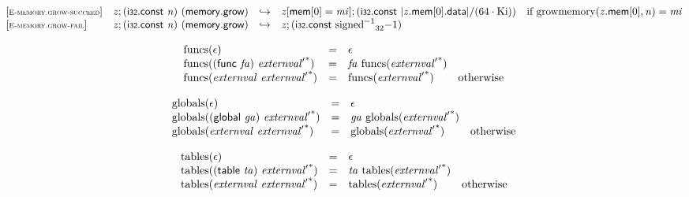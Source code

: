 \vspace{1ex}

$$
\begin{array}{@{}l@{}lcl@{}l@{}}
{[\textsc{\scriptsize E{-}memory.grow{-}succeed}]} \quad & {\mathit{z}} ; (\mathsf{i{\scriptstyle32}}.\mathsf{const}~{\mathit{n}})~(\mathsf{memory.grow}) &\hookrightarrow& {\mathit{z}}[\mathsf{mem}[0] = {\mathit{mi}}] ; (\mathsf{i{\scriptstyle32}}.\mathsf{const}~{|{{\mathit{z}}.\mathsf{mem}}{[0]}.\mathsf{data}|} / (64 \cdot {\mathrm{Ki}})) &\quad
  \mbox{if}~{\mathrm{growmemory}}({{\mathit{z}}.\mathsf{mem}}{[0]}, {\mathit{n}}) = {\mathit{mi}} \\
{[\textsc{\scriptsize E{-}memory.grow{-}fail}]} \quad & {\mathit{z}} ; (\mathsf{i{\scriptstyle32}}.\mathsf{const}~{\mathit{n}})~(\mathsf{memory.grow}) &\hookrightarrow& {\mathit{z}} ; (\mathsf{i{\scriptstyle32}}.\mathsf{const}~{{{{{\mathrm{signed}}^{{-1}}}}{}}_{32}}{{-1}}) &  \\
\end{array}
$$

$$
\begin{array}{@{}lcl@{}l@{}}
{\mathrm{funcs}}(\epsilon) &=& \epsilon &  \\
{\mathrm{funcs}}((\mathsf{func}~{\mathit{fa}})~{{\mathit{externval}'}^\ast}) &=& {\mathit{fa}}~{\mathrm{funcs}}({{\mathit{externval}'}^\ast}) &  \\
{\mathrm{funcs}}({\mathit{externval}}~{{\mathit{externval}'}^\ast}) &=& {\mathrm{funcs}}({{\mathit{externval}'}^\ast}) &\quad
  \mbox{otherwise} \\
\end{array}
$$

$$
\begin{array}{@{}lcl@{}l@{}}
{\mathrm{globals}}(\epsilon) &=& \epsilon &  \\
{\mathrm{globals}}((\mathsf{global}~{\mathit{ga}})~{{\mathit{externval}'}^\ast}) &=& {\mathit{ga}}~{\mathrm{globals}}({{\mathit{externval}'}^\ast}) &  \\
{\mathrm{globals}}({\mathit{externval}}~{{\mathit{externval}'}^\ast}) &=& {\mathrm{globals}}({{\mathit{externval}'}^\ast}) &\quad
  \mbox{otherwise} \\
\end{array}
$$

$$
\begin{array}{@{}lcl@{}l@{}}
{\mathrm{tables}}(\epsilon) &=& \epsilon &  \\
{\mathrm{tables}}((\mathsf{table}~{\mathit{ta}})~{{\mathit{externval}'}^\ast}) &=& {\mathit{ta}}~{\mathrm{tables}}({{\mathit{externval}'}^\ast}) &  \\
{\mathrm{tables}}({\mathit{externval}}~{{\mathit{externval}'}^\ast}) &=& {\mathrm{tables}}({{\mathit{externval}'}^\ast}) &\quad
  \mbox{otherwise} \\
\end{array}
$$

